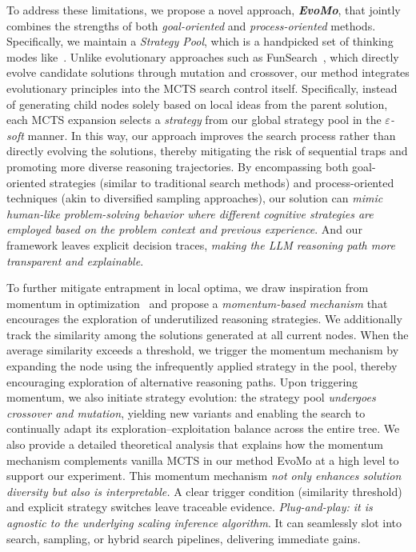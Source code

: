 \documentclass{article} %
\theoremstyle{definition}
\theoremstyle{remark}
\newcommand{\ourmethod}{{\fontfamily{lmtt}\selectfont EvoMo}\xspace}
\begin{document}
To address these limitations, we propose a novel approach, \textbf{\textit{EvoMo}}, that jointly combines the strengths of both \textit{goal-oriented} and \textit{process-oriented} methods. Specifically, we maintain a \textit{Strategy Pool}, which is a handpicked set of thinking modes like~\citep{wang2025diversified, chen2024reverse}. Unlike evolutionary approaches such as FunSearch~\citep{FunSearch2023}, which directly evolve candidate solutions through mutation and crossover, our method integrates evolutionary principles into the MCTS search control itself. Specifically, instead of generating child nodes solely based on local ideas from the parent solution, each MCTS expansion selects a \textit{strategy} from our global strategy pool in the \textit{$\varepsilon$-soft} manner. In this way, our approach improves the search process rather than directly evolving the solutions, thereby mitigating the risk of sequential traps and promoting more diverse reasoning trajectories. By encompassing both goal-oriented strategies (similar to traditional search methods) and process-oriented techniques (akin to diversified sampling approaches), our solution can  \textit{mimic human-like problem-solving behavior where different cognitive strategies are employed based on the problem context and previous experience}. And our framework leaves explicit decision traces,  \textit{making the LLM reasoning path more transparent and explainable}.




To further mitigate entrapment in local optima, we draw inspiration from momentum in optimization~\citep{sutskever2013importance} and propose a \textit{momentum-based mechanism} that encourages the exploration of underutilized reasoning strategies. We additionally track the similarity among the solutions generated at all current nodes. When the average similarity exceeds a threshold, we trigger the momentum mechanism by expanding the node using the infrequently applied strategy in the pool, thereby encouraging exploration of alternative reasoning paths. Upon triggering momentum, we also initiate strategy evolution: the strategy pool \textit{undergoes crossover and mutation}, yielding new variants and enabling the search to continually adapt its exploration–exploitation balance across the entire tree. We also provide a detailed theoretical analysis 
that explains how the momentum mechanism complements vanilla MCTS in our method \ourmethod at a high level to support our experiment. This momentum mechanism  \textit{not only enhances solution diversity but also is interpretable.} A clear trigger condition (similarity threshold) and explicit strategy switches leave traceable evidence.  \textit{Plug-and-play: it is agnostic to the underlying scaling inference algorithm}. It can seamlessly slot into search, sampling, or hybrid search pipelines, delivering immediate gains. 
\end{document}
